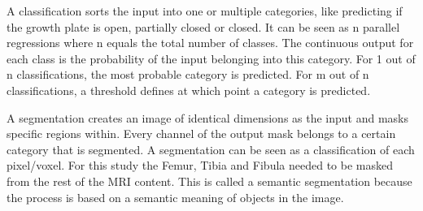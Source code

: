 A classification sorts the input into one or multiple categories, like predicting if the growth plate is open, partially closed or closed. It can be seen as n parallel regressions where n equals the total number of classes. The continuous output for each class is the probability of the input belonging into this category. For 1 out of n classifications, the most probable category is predicted. For m out of n classifications, a threshold defines at which point a category is predicted.

A segmentation creates an image of identical dimensions as the input and masks specific regions within. Every channel of the output mask belongs to a certain category that is segmented. A segmentation can be seen as a classification of each pixel/voxel. For this study the Femur, Tibia and Fibula needed to be masked from the rest of the MRI content. This is called a semantic segmentation because the process is based on a semantic meaning of objects in the image.

\newpage